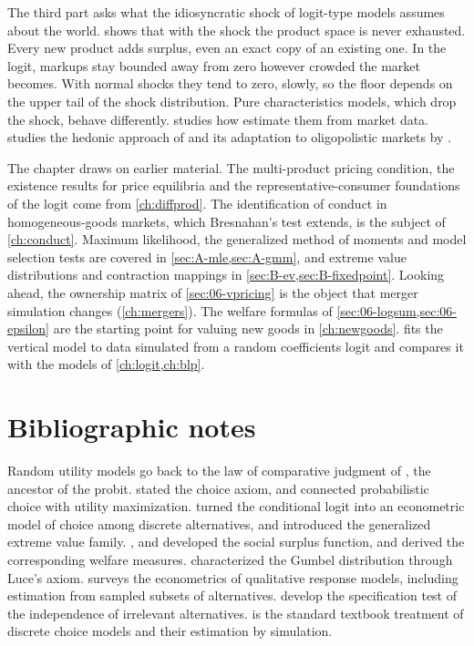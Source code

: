 The third part asks what the idiosyncratic shock of logit-type models assumes about the world. 
shows that with the shock the product space is never exhausted. Every new product adds surplus, even an exact copy of an
existing one. In the logit, markups stay bounded away from zero however crowded the market becomes. With normal shocks
they tend to zero, slowly, so the floor depends on the upper tail of the shock distribution. Pure characteristics
models, which drop the shock, behave differently.  studies how \citet{BerryPakes2007} estimate
them from market data.  studies the hedonic approach of \citet{Rosen1974} and its adaptation to
oligopolistic markets by \citet{BajariBenkard2005}.

The chapter draws on earlier material. The multi-product pricing condition, the existence results for price
equilibria and the representative-consumer foundations of the logit come from \cref{ch:diffprod}. The identification
of conduct in homogeneous-goods markets, which Bresnahan's test extends, is the subject of \cref{ch:conduct}.
Maximum likelihood, the generalized method of moments and model selection tests are covered in
\cref{sec:A-mle,sec:A-gmm}, and extreme value distributions and contraction mappings in
\cref{sec:B-ev,sec:B-fixedpoint}. Looking ahead,
the ownership matrix of \cref{sec:06-vpricing} is the object that merger simulation changes (\cref{ch:mergers}). The
welfare formulas of \cref{sec:06-logsum,sec:06-epsilon} are the starting point for valuing new goods in
\cref{ch:newgoods}.  fits the vertical model to data simulated from a random coefficients logit and
compares it with the models of \cref{ch:logit,ch:blp}.






\section{Bibliographic notes}\label{sec:06-notes}

Random utility models go back to the law of comparative judgment of \citet{Thurstone1927}, the ancestor of the
probit. \citet{Luce1959} stated the choice axiom, and \citet{Marschak1960} connected probabilistic choice with
utility maximization. \citet{McFadden1974} turned the conditional logit into an econometric model of choice among
discrete alternatives, and \citet{McFadden1978} introduced the generalized extreme value family. \citet{Williams1977},
\citet{DalyZachary1978} and \citet{McFadden1981} developed the social surplus function, and \citet{SmallRosen1981}
derived the corresponding welfare measures. \citet{Yellott1977} characterized the Gumbel distribution through Luce's
axiom. \citet{McFadden1984} surveys the econometrics of qualitative response models, including estimation from
sampled subsets of alternatives. \citet{HausmanMcFadden1984}
develop the specification test of the independence of irrelevant alternatives. \citet{Train2009} is the standard
textbook treatment of discrete choice models and their estimation by simulation.

